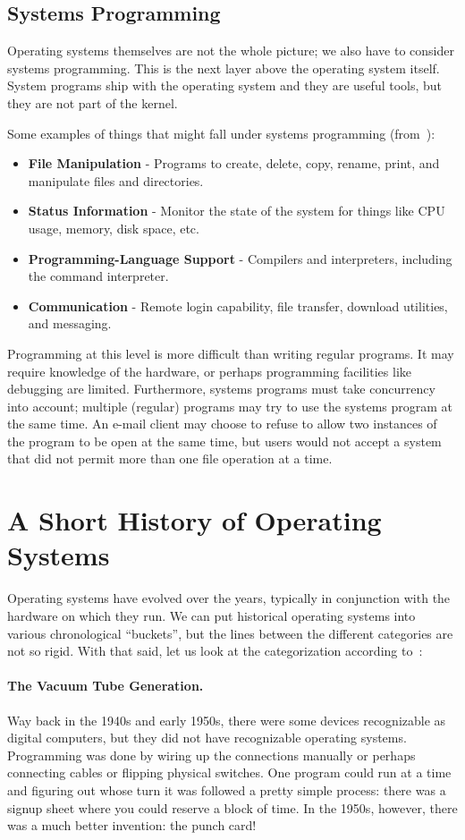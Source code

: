 \subsection*{Systems Programming}
Operating systems themselves are not the whole picture; we also have to consider systems programming. This is the next layer above the operating system itself. System programs ship with the operating system and they are useful tools, but they are not part of the kernel. 

Some examples of things that might fall under systems programming (from~\cite{osc}):

\begin{itemize}
	\item \textbf{File Manipulation} - Programs to create, delete, copy, rename, print, and manipulate files and directories.
	\item \textbf{Status Information} - Monitor the state of the system for things like CPU usage, memory, disk space, etc.
	\item \textbf{Programming-Language Support} - Compilers and interpreters, including the command interpreter.
	\item \textbf{Communication} - Remote login capability, file transfer, download utilities, and messaging.
\end{itemize}

Programming at this level is more difficult than writing regular programs. It may require knowledge of the hardware, or perhaps programming facilities like debugging are limited. Furthermore, systems programs must take concurrency into account; multiple (regular) programs may try to use the systems program at the same time. An e-mail client may choose to refuse to allow two instances of the program to be open at the same time, but users would not accept a system that did not permit more than one file operation at a time. 

\section*{A Short History of Operating Systems}
Operating systems have evolved over the years, typically in conjunction with the hardware on which they run. We can put historical operating systems into various chronological ``buckets'', but the lines between the different categories are not so rigid. With that said, let us look at the categorization according to~\cite{mos}:

\paragraph{The Vacuum Tube Generation.} Way back in the 1940s and early 1950s, there were some devices recognizable as digital computers, but they did not have recognizable operating systems. Programming was done by wiring up the connections manually or perhaps connecting cables or flipping physical switches. One program could run at a time and figuring out whose turn it was followed a pretty simple process: there was a signup sheet where you could reserve a block of time. In the 1950s, however, there was a much better invention: the punch card!

